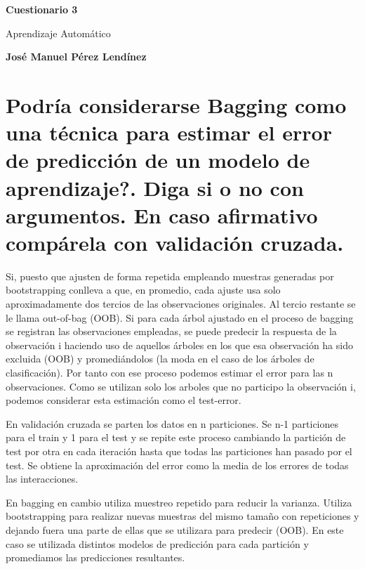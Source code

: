 \documentclass[titlepage]{article}
\begin{document}
	\begin{titlepage}
		\begin{center}
			\vspace*{1cm}
			\date{} %
			\Huge
			\textbf{Cuestionario 3}
			
			\vspace{0.5cm}
			\LARGE
			Aprendizaje Automático
			
			\vspace{1.5cm}
			
			\textbf{José Manuel Pérez Lendínez}
			

			
		\end{center}
	\end{titlepage}	
	\newpage

\section{Podría considerarse Bagging como una técnica para estimar el error de predicción de un modelo de aprendizaje?. Diga si o no con argumentos. En caso afirmativo compárela con validación cruzada.}
	
Si, puesto que ajusten de forma repetida empleando muestras generadas por bootstrapping conlleva a que, en promedio, cada ajuste usa solo aproximadamente dos tercios de las observaciones originales. Al tercio restante se le llama out-of-bag (OOB). Si para cada árbol ajustado en el proceso de bagging se registran las observaciones empleadas, se puede predecir la respuesta de la observación i haciendo uso de aquellos árboles en los que esa observación ha sido excluida (OOB) y promediándolos (la moda en el caso de los árboles de clasificación). Por tanto con ese proceso podemos estimar el error para las n observaciones. Como se utilizan solo los arboles que no participo la observación i, podemos considerar esta estimación como el test-error. 

En validación cruzada se parten los datos en n particiones. Se n-1 particiones para el train y 1 para el test y se repite este proceso cambiando la partición de test por otra en cada iteración hasta que todas las particiones han pasado por el test. Se obtiene la aproximación del error como la media de los errores de todas las interacciones.
  
En bagging en cambio utiliza muestreo repetido para reducir la varianza. Utiliza bootstrapping para realizar nuevas muestras del mismo tamaño con repeticiones y dejando fuera una parte de ellas que se utilizara para predecir (OOB). En este caso se utilizada distintos modelos de predicción para cada partición y promediamos las predicciones resultantes.
  	 
\end{document}
